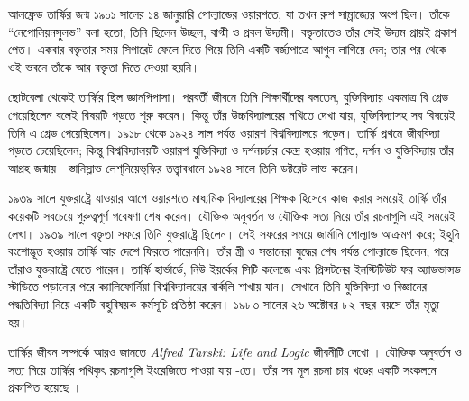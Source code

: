 \documentclass[../../../include/open-logic-section]{subfiles}
\begin{document}



আলফ্রেড তার্স্কির জন্ম ১৯০১ সালের ১৪
জানুয়ারি পোল্যান্ডের ওয়ারশতে, যা তখন
রুশ সাম্রাজ্যের অংশ ছিল। তাঁকে
“নেপোলিয়নসুলভ” বলা হতো; তিনি ছিলেন
উচ্ছল, বাগ্মী ও প্রবল উদ্যমী। বক্তৃতাতেও
তাঁর সেই উদ্যম প্রায়ই প্রকাশ পেত। একবার
বক্তৃতার সময় সিগারেট ফেলে দিতে গিয়ে
তিনি একটি বর্জ্যপাত্রে আগুন লাগিয়ে দেন;
তার পর থেকে ওই ভবনে তাঁকে আর
বক্তৃতা দিতে দেওয়া হয়নি।

ছোটবেলা থেকেই তার্স্কির ছিল জ্ঞানপিপাসা।
পরবর্তী জীবনে তিনি শিক্ষার্থীদের বলতেন,
যুক্তিবিদ্যায় একমাত্র বি গ্রেড পেয়েছিলেন
বলেই বিষয়টি পড়তে শুরু করেন। কিন্তু
তাঁর উচ্চবিদ্যালয়ের নথিতে দেখা যায়,
যুক্তিবিদ্যাসহ সব বিষয়েই তিনি এ গ্রেড
পেয়েছিলেন। ১৯১৮ থেকে ১৯২৪ সাল
পর্যন্ত ওয়ারশ বিশ্ববিদ্যালয়ে পড়েন।
তার্স্কি প্রথমে জীববিদ্যা পড়তে চেয়েছিলেন;
কিন্তু বিশ্ববিদ্যালয়টি ওয়ারশ যুক্তিবিদ্যা
ও দর্শনচর্চার কেন্দ্র হওয়ায় গণিত,
দর্শন ও যুক্তিবিদ্যায় তাঁর আগ্রহ জন্মায়।
স্তানিস্লাভ লেশ্‌নিয়েভ্‌স্কির তত্ত্বাবধানে
১৯২৪ সালে তিনি ডক্টরেট লাভ করেন।

১৯৩৯ সালে যুক্তরাষ্ট্রে যাওয়ার আগে
ওয়ারশতে মাধ্যমিক বিদ্যালয়ের শিক্ষক
হিসেবে কাজ করার সময়েই তার্স্কি তাঁর
কয়েকটি সবচেয়ে গুরুত্বপূর্ণ গবেষণা শেষ
করেন। যৌক্তিক অনুবর্তন ও যৌক্তিক সত্য
নিয়ে তাঁর রচনাগুলি এই সময়েই লেখা।
১৯৩৯ সালে বক্তৃতা সফরে তিনি যুক্তরাষ্ট্রে
ছিলেন। সেই সফরের সময়ে জার্মানি
পোল্যান্ড আক্রমণ করে; ইহুদি বংশোদ্ভূত
হওয়ায় তার্স্কি আর দেশে ফিরতে
পারেননি। তাঁর স্ত্রী ও সন্তানেরা যুদ্ধের
শেষ পর্যন্ত পোল্যান্ডে ছিলেন; পরে
তাঁরাও যুক্তরাষ্ট্রে যেতে পারেন।
তার্স্কি হার্ভার্ডে, নিউ ইয়র্কের সিটি
কলেজে এবং প্রিন্সটনের ইনস্টিটিউট
ফর অ্যাডভান্সড স্টাডিতে পড়ানোর
পরে ক্যালিফোর্নিয়া বিশ্ববিদ্যালয়ের
বার্কলি শাখায় যান। সেখানে তিনি
যুক্তিবিদ্যা ও বিজ্ঞানের পদ্ধতিবিদ্যা
নিয়ে একটি বহুবিষয়ক কর্মসূচি
প্রতিষ্ঠা করেন। ১৯৮৩ সালের ২৬
অক্টোবর ৮২ বছর বয়সে তাঁর
মৃত্যু হয়।

\begin{reading}
তার্স্কির জীবন সম্পর্কে আরও জানতে
\emph{Alfred Tarski: Life and Logic}
জীবনীটি দেখো \citep{Feferman2004}।
যৌক্তিক অনুবর্তন ও সত্য নিয়ে
তার্স্কির পথিকৃৎ রচনাগুলি ইংরেজিতে
পাওয়া যায় \citep{Tarski1983}-তে।
তাঁর সব মূল রচনা চার খণ্ডের একটি
সংকলনে প্রকাশিত হয়েছে
\citep{Tarski1981}।
\end{reading}
\end{document}
